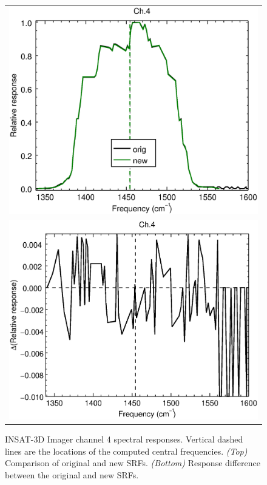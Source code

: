 \begin{figure}[H]
  \centering
  \begin{tabular}{c}
    \includegraphics[scale=0.55]{graphics/imgr/srf/imgr_insat3d-4.eps} \\
    \includegraphics[scale=0.55]{graphics/imgr/srf/imgr_insat3d-4.difference.eps}
  \end{tabular}
  \caption{INSAT-3D Imager channel 4 spectral responses. Vertical dashed lines are the locations of the computed central frequencies. \emph{(Top)} Comparison of original and new SRFs. \emph{(Bottom)} Response difference between the original and new SRFs.}
  \label{fig:imgr_ch4}
\end{figure}


